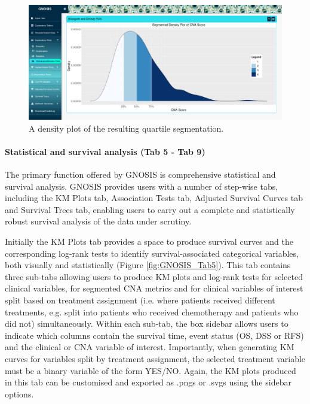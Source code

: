 \begin{figure}[!h]
\center
\includegraphics[width=1\textwidth]{../figures/Chapter_3/GNOSIS_Fig4.png}
\caption[A density plot of the resulting quartile segmentation.]{A density plot of the resulting quartile segmentation.}
\label{GNOSIS_Tab4}
\end{figure}

\paragraph{Statistical and survival analysis (Tab 5 - Tab 9)}
\hfill

\noindent The primary function offered by GNOSIS is comprehensive statistical and survival analysis. GNOSIS provides users with a number of step-wise tabs, including the KM Plots tab, Association Tests tab, Adjusted Survival Curves tab and Survival Trees tab, enabling users to carry out a complete and statistically robust survival analysis of the data under scrutiny.  

Initially the KM Plots tab provides a space to produce survival curves and the corresponding log-rank tests to identify survival-associated categorical variables, both visually and statistically (Figure \ref{fig:GNOSIS_Tab5}). This tab contains three sub-tabs allowing users to produce KM plots and log-rank tests for selected clinical variables, for segmented CNA metrics and for clinical variables of interest split based on treatment assignment (i.e. where patients received different treatments, e.g. split into patients who received chemotherapy and patients who did not) simultaneously. Within each sub-tab, the box sidebar allows users to indicate which columns contain the survival time, event status (OS, DSS or RFS) and the clinical or CNA variable of interest. Importantly, when generating KM curves for variables split by treatment assignment, the selected treatment variable must be a binary variable of the form YES/NO. Again, the KM plots produced in this tab can be customised and exported as .pngs or .svgs using the sidebar options. 

